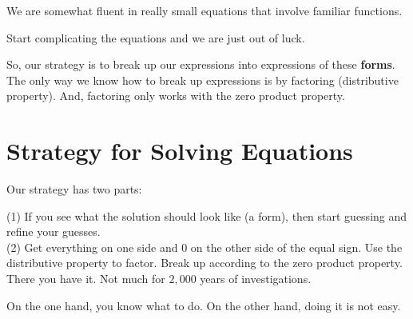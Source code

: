 \documentclass{ximera}
\begin{document}
We are somewhat fluent in really small equations that involve familiar functions.  



Start complicating the equations and we are just out of luck.


So, our strategy is to break up our expressions into expressions of these \textbf{\textcolor{blue!55!black}{forms}}.  The only way we know how to break up expressions is by factoring (distributive property).  And, factoring only works with the zero product property.



\section{Strategy for Solving Equations}


Our strategy has two parts:


(1) If you see what the solution should look like (a form), then start guessing and refine your guesses.\\
(2) Get everything on one side and $0$ on the other side of the equal sign. Use the distributive property to factor.  Break up according to the zero product property. \\




There you have it. Not much for $2,000$ years of investigations.

On the one hand, you know what to do.  On the other hand, doing it is not easy.
\end{document}
